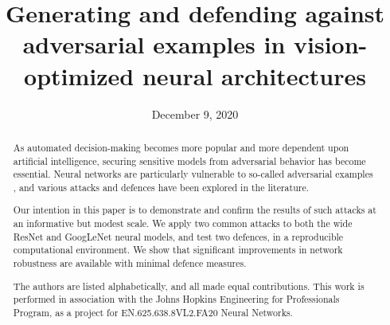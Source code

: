 \documentclass[conference]{IEEEtran}
\begin{document}
\title{Generating and defending against adversarial examples in
vision-optimized neural architectures}
\specialpapernotice{}
\date{December 9, 2020}

\author{
\and
{}
\and
{}
}%

\maketitle%

\begin{abstract}%

As automated decision-making becomes more popular and more dependent upon
artificial intelligence, securing sensitive models from adversarial behavior
has become essential. Neural networks are particularly vulnerable to
so-called adversarial examples \cite{szegedy2014intriguing}, and various
attacks and defences have been explored in the literature.

Our intention in this paper is to demonstrate and confirm the results of
such attacks at an informative but modest scale. We apply two common attacks
to both the wide ResNet and GoogLeNet neural models, and test two defences,
in a reproducible computational environment. We show that significant
improvements in network robustness are available with minimal defence
measures. 

The authors are listed alphabetically, and all made equal contributions.
This work is performed in association with the Johns Hopkins Engineering for
Professionals Program, as a project for EN.625.638.8VL2.FA20 Neural Networks.

\end{abstract}%
\end{document}
